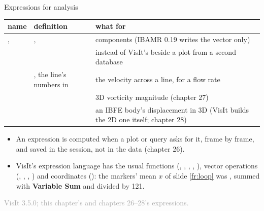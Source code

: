 \documentclass[aspectratio=169,11pt]{beamer}
\newcommand{\sourcecredit}[1]{\vfill\begin{flushright}\tiny\textcolor{DarkGray}{#1}\end{flushright}}
\newcommand{\gui}[1]{\textsf{\textbf{#1}}}
\begin{document}
\begin{frame}{Expressions for analysis}
\label{fr:expr}
\footnotesize
\begin{center}
\begin{tabular}{@{}L{0.16\textwidth}L{0.3\textwidth}L{0.48\textwidth}@{}}
\toprule
name & definition & what for \\
\midrule
{},  & ,  & components (IBAMR 0.19 writes the vector only) \\
 &  & instead of VisIt's  beside a plot from a second database \\
 & , the line's numbers in & the velocity across a line, for a flow rate \\
 &  & 3D vorticity magnitude (chapter 27) \\
 &  & an IBFE body's displacement in 3D (VisIt builds the 2D one itself; chapter 28) \\
\bottomrule
\end{tabular}
\end{center}
\begin{itemize}
  \item An expression is computed when a plot or query asks for it, frame by frame, and saved in the session, not in the data (chapter 26).
  \item VisIt's expression language has the usual functions (, , , , ), vector operations (, , , ) and coordinates (): the markers' mean $x$ of slide \ref{fr:loop} was , summed with \gui{Variable Sum} and divided by 121.
\end{itemize}
\sourcecredit{VisIt 3.5.0; this chapter's and chapters 26--28's expressions.}
\end{frame}
\end{document}
